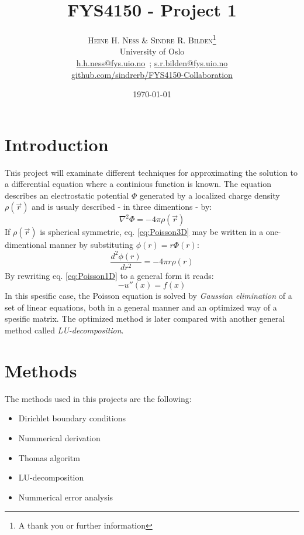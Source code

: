 \documentclass[twoside,twocolumn]{article}
\title{FYS4150 - Project 1} %
\author{%
\textsc{Heine H. Ness \& Sindre R. Bilden}\thanks{A thank you or further information} \\[1ex] %
\normalsize University of Oslo \\ %
\normalsize \href{mailto:h.h.ness@fys.uio.no}{h.h.ness@fys.uio.no}\ ; \href{mailto:s.r.bilden@fys.uio.no}{s.r.bilden@fys.uio.no}\\%
\normalsize \href{https://github.com/sindrerb/FYS4150-Collaboration}{github.com/sindrerb/FYS4150-Collaboration}
}
\date{\today} %
\begin{document}
\maketitle


\section{Introduction}

\lettrine[nindent=0em,lines=3]{T}his project will examinate different techniques for approximating the solution to a differential equation where a continious function is known. The equation describes an electrostatic potential $\Phi$ generated by a localized charge density $\rho(\vec{r})$ and is usualy described - in three dimentions - by:
\begin{equation}
\nabla^2\Phi = -4\pi \rho(\vec{r}) \label{eq:Poisson3D}
\end{equation}
If $\rho(\vec{r})$ is spherical symmetric, eq. \ref{eq:Poisson3D} may be written in a one-dimentional manner by substituting $\phi(r)=r\Phi(r)$:
\begin{equation}
\frac{d^2\phi(r)}{dr^2}=-4\pi r\rho(r) \label{eq:Poisson1D}
\end{equation}
By rewriting eq. \ref{eq:Poisson1D} to a general form it reads:
\begin{equation}
-u''(x)=f(x)
\end{equation}
In this spesific case, the Poisson equation is solved by \textit{Gaussian elimination} of a set of linear equations, both in a general manner and an optimized way of a spesific matrix. The optimized method is later compared with another general method called \textit{LU-decomposition}.


\section{Methods}
The methods used in this projects are the following:
\begin{itemize}
\item Dirichlet boundary conditions
\item Nummerical derivation
\item Thomas algoritm
\item LU-decomposition
\item Nummerical error analysis
\end{itemize}
\end{document}
